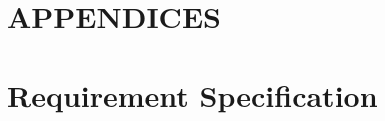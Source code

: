 \chapter*{APPENDICES}

\begingroup\let\clearpage\relax
\chapter{Requirement Specification}
\label{chap:requirement_specification}
\endgroup

